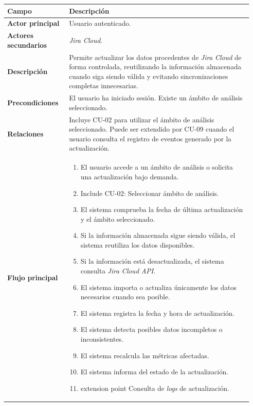 {\renewcommand{\arraystretch}{1.25}\footnotesize
\begin{longtable}{p{3.2cm}p{10.2cm}}
\toprule
\textbf{Campo} & \textbf{Descripción} \\
\midrule
\textbf{Actor principal} & Usuario autenticado. \\
\textbf{Actores secundarios} & \textit{Jira Cloud}. \\
\textbf{Descripción} & Permite actualizar los datos procedentes de \textit{Jira Cloud} de forma controlada, reutilizando la información almacenada cuando siga siendo válida y evitando sincronizaciones completas innecesarias. \\
\textbf{Precondiciones} & El usuario ha iniciado sesión. Existe un ámbito de análisis seleccionado. \\
\textbf{Relaciones} & Incluye CU-02 para utilizar el ámbito de análisis seleccionado. Puede ser extendido por CU-09 cuando el usuario consulta el registro de eventos generado por la actualización. \\
\textbf{Flujo principal} & \begin{minipage}[t]{10.2cm}\begin{enumerate}[noitemsep,leftmargin=*]
    \item El usuario accede a un ámbito de análisis o solicita una actualización bajo demanda.
    \item Include CU-02: Seleccionar ámbito de análisis.
    \item El sistema comprueba la fecha de última actualización y el ámbito seleccionado.
    \item Si la información almacenada sigue siendo válida, el sistema reutiliza los datos disponibles.
    \item Si la información está desactualizada, el sistema consulta \textit{Jira Cloud} \textit{API}.
    \item El sistema importa o actualiza únicamente los datos necesarios cuando sea posible.
    \item El sistema registra la fecha y hora de actualización.
    \item El sistema detecta posibles datos incompletos o inconsistentes.
    \item El sistema recalcula las métricas afectadas.
    \item El sistema informa del estado de la actualización.
    \item[] extension point Consulta de \textit{logs} de actualización.
\end{enumerate}\end{minipage} \\

\end{longtable}}
